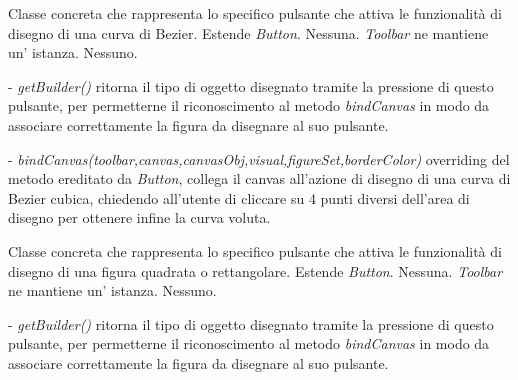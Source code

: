 Classe concreta che rappresenta lo specifico pulsante che attiva le funzionalit\` a di disegno di una curva di Bezier.
Estende \textit{Button}.
Nessuna.
\textit{Toolbar} ne mantiene un' istanza.
Nessuno.
\begin{elencopuntato}[\subsubsecindent]
\item[-] \textit{getBuilder()} ritorna il tipo di oggetto disegnato tramite la pressione di questo pulsante, per permetterne il riconoscimento al metodo \textit{bindCanvas} in modo da associare correttamente la figura da disegnare al suo pulsante.
\item[-]  \textit{bindCanvas(toolbar,canvas,canvasObj,visual,figureSet,borderColor)} overriding del metodo ereditato da \textit{Button}, collega il canvas all'azione di disegno di una curva di Bezier cubica,  chiedendo all'utente di cliccare su 4 punti diversi dell'area di disegno per ottenere infine la curva voluta.
\end{elencopuntato}

Classe concreta che rappresenta lo specifico pulsante che attiva le funzionalit\` a di disegno di una figura quadrata o rettangolare.
Estende \textit{Button}.
Nessuna.
\textit{Toolbar} ne mantiene un' istanza.
Nessuno.
\begin{elencopuntato}[\subsubsecindent]
\item[-] \textit{getBuilder()} ritorna il tipo di oggetto disegnato tramite la pressione di questo pulsante, per permetterne il riconoscimento al metodo \textit{bindCanvas} in modo da associare correttamente la figura da disegnare al suo pulsante.
\end{elencopuntato}

